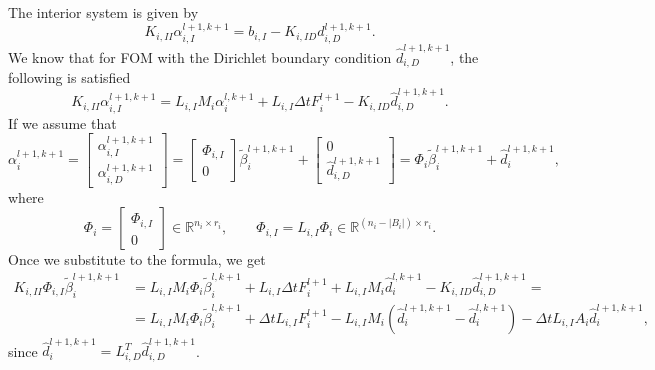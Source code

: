 \documentclass[a4paper, 11pt]{article}
\theoremstyle{plain}
\theoremstyle{definition}
\theoremstyle{remark}
\begin{document}
The interior system is given by
\begin{equation*}
    K_{i, II}\alpha_{i, I}^{l+1, k+1} = b_{i, I} - K_{i, ID}d^{l+1, k+1}_{i, D}.
\end{equation*}
\newpage
We know that for FOM with the Dirichlet boundary condition $\hat{d}^{l+1, k+1}_{i, D}$, the following is satisfied
\begin{equation*}
    \boxed{K_{i, II}\alpha_{i, I}^{l+1, k+1} = L_{i, I}M_{i}\alpha_{i}^{l, k+1} + 
    L_{i, I}\Delta t F_{i}^{l+1} - K_{i, ID}\hat{d}^{l+1, k+1}_{i, D}}.
\end{equation*}
If we assume that
\begin{equation*}
    \alpha_{i}^{l+1, k+1} = 
    \begin{bmatrix}
        \alpha_{i, I}^{l+1, k+1}\\
        \alpha_{i, D}^{l+1, k+1}
    \end{bmatrix}
    =
    \begin{bmatrix}
        \Phi_{i, I}\\
        0
    \end{bmatrix}
    \tilde{\beta}_{i}^{l+1, k+1} + 
    \begin{bmatrix}
        0\\
        \hat{d}_{i, D}^{l+1, k+1}
    \end{bmatrix}
    =
    \Phi_{i}\tilde{\beta}_{i}^{l+1, k+1} + \hat{d}_{i}^{l+1, k+1},
\end{equation*}
where
\begin{equation*}
    \Phi_{i} = 
    \begin{bmatrix}
        \Phi_{i, I}\\
        0
    \end{bmatrix} \in \mathbb{R}^{n_{i}\times r_{i}}, \qquad  \Phi_{i, I} = L_{i, I}\Phi_{i}\in \mathbb{R}^{(n_{i} - \lvert B_{i}\rvert) \times r_{i}}.
\end{equation*}
Once we substitute to the formula, we get
\begin{align*}
    K_{i, II}\Phi_{i, I} \tilde{\beta}_{i}^{l+1, k+1} &= L_{i, I}M_{i}\Phi_{i}\tilde{\beta}_{i}^{l, k+1} + 
    L_{i, I}\Delta t F_{i}^{l+1} + L_{i, I}M_{i}\hat{d}_{i}^{l, k+1} - K_{i, ID}\hat{d}^{l+1, k+1}_{i, D} = \\
    &= L_{i, I}M_{i}\Phi_{i}\tilde{\beta}_{i}^{l, k+1} + 
    \Delta t L_{i, I} F_{i}^{l+1} - L_{i, I}M_{i}\left(\hat{d}_{i}^{l+1, k+1} - \hat{d}_{i}^{l, k+1}\right) - \Delta t L_{i, I}A_{i}\hat{d}^{l+1, k+1}_{i},
\end{align*}
since $\hat{d}^{l+1, k+1}_{i} = L_{i, D}^{T}\hat{d}^{l+1, k+1}_{i, D}$.
\end{document}

